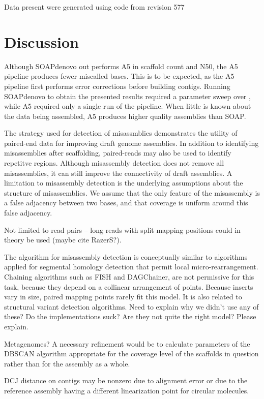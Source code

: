 \documentclass{bioinfo}
\begin{document}
Data present were generated using code from revision 577

\section{Discussion}

Although SOAPdenovo out performs A5 in scaffold count and N50, the A5 pipeline produces fewer miscalled bases. This is to
be expected, as the A5 pipeline first performs error corrections before building contigs. Running SOAPdenovo to
obtain the presented results required a parameter sweep over , while A5 required
only a single run of the pipeline. When little is known about the data being assembled, A5 produces higher quality assemblies 
than SOAP.

The strategy used for detection of misassmblies demonstrates the utility of paired-end data for improving draft genome assemblies.
In addition to identifying misassemblies after scaffolding, paired-reads may also be used to identify repetitve regions.   
Although misassembly detection does not remove all misassemblies, it can still improve the connectivity of draft assemblies.
A limitation to misassembly detection is the underlying assumptions about the structure of misassemblies. We assume that the only
feature of the misassembly is a false adjacency between two bases, and that coverage is uniform around this false adjacency. 

Not limited to read pairs -- long reads with split mapping positions could in theory be used (maybe cite RazerS?).

The algorithm for misassembly detection is conceptually similar to algorithms applied for segmental homology detection that permit local micro-rearrangement. Chaining algorithms such as FISH and DAGChainer, are not permissive for this task, because they depend on a collinear arrangement of points. Because inserts vary in size, paired mapping points rarely fit this model.  It is also related to structural variant detection algorithms. Need to explain why we didn't use any of these?  Do the implementations suck? Are they not quite the right model? Please explain.


Metagenomes? A necessary refinement would be to calculate parameters of the DBSCAN algorithm appropriate for the coverage level of the 
scaffolds in question rather than for the assembly as a whole.

DCJ distance on contigs may be nonzero due to alignment error or due to the reference assembly having a different linearization point
for circular molecules. 
\end{document}
